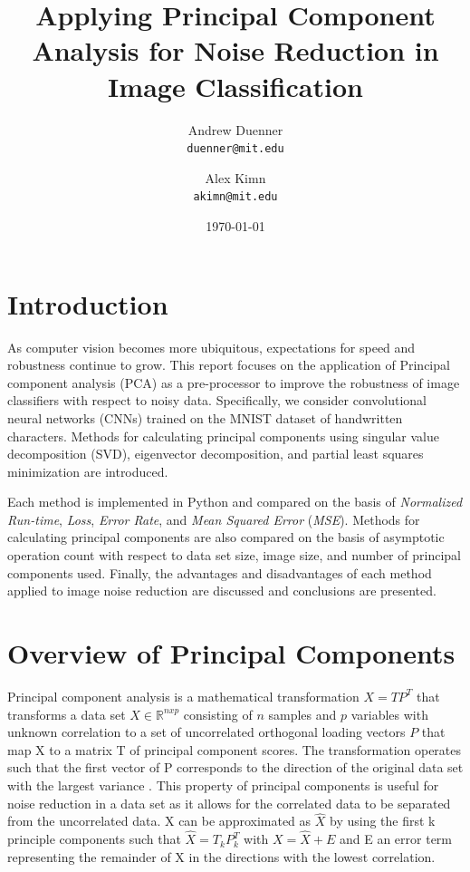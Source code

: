 \documentclass[12pt]{article}
\title{Applying Principal Component Analysis for Noise Reduction in Image Classification
}
\author{Andrew Duenner \\\texttt{duenner@mit.edu} \and Alex Kimn \\\texttt{akimn@mit.edu}}
\date{\today}
\begin{document}
\maketitle


\pagebreak
\tableofcontents

\pagebreak
\section{Introduction}\label{1}
As computer vision becomes more ubiquitous, expectations for speed and robustness continue to grow. This report focuses on the application of Principal component analysis (PCA) as a pre-processor to improve the robustness of image classifiers with respect to noisy data. Specifically, we consider convolutional neural networks (CNNs) trained on the MNIST dataset of handwritten characters. Methods for calculating principal components using singular value decomposition (SVD), eigenvector decomposition, and partial least squares minimization are introduced.

Each method is implemented in Python and compared on the basis of \textit{Normalized Run-time}, \textit{Loss},  \textit{Error Rate}, and \textit{Mean Squared Error} (\textit{MSE}). Methods for calculating principal components are also compared on the basis of asymptotic operation count with respect to data set size, image size, and number of principal components used. Finally, the advantages and disadvantages of each method applied to image noise reduction are discussed and conclusions are presented.


\section{Overview of Principal Components}\label{2}
Principal component analysis is a mathematical transformation $X=TP^T$ that transforms a data set $X \in \mathbb{R}^{nxp}$ consisting of $n$ samples and $p$ variables with unknown correlation to a set of uncorrelated orthogonal loading vectors $P$  that map X to a matrix T of principal component scores. The transformation operates such that the first vector of P corresponds to the direction of the original data set with the largest variance \cite{jolliffe1986principal}. This property of principal components is useful for noise reduction in a data set as it allows for the correlated data to be separated from the uncorrelated data. X can be approximated as $\hat{X}$ by using the first k principle components such that $\hat{X}=T_kP_k^T$ with $X=\hat{X}+E$ and E an error term representing the remainder of X in the directions with the lowest correlation.
\end{document}
